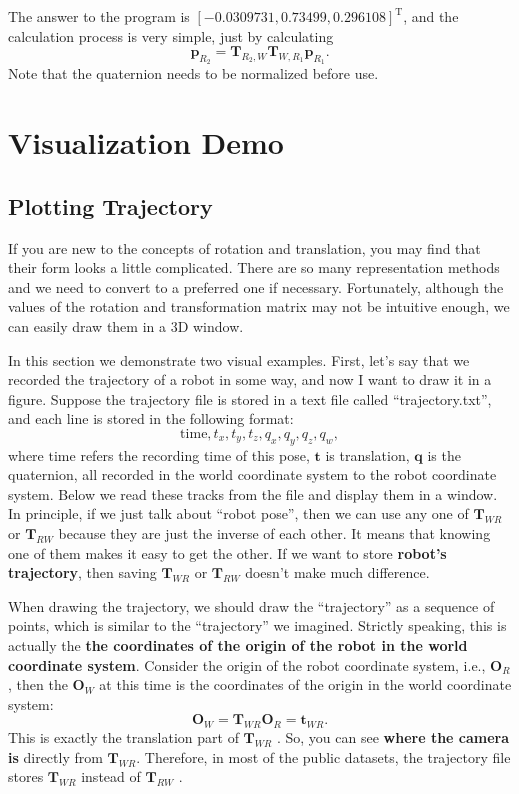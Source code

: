 The answer to the program is $ [- 0.0309731 , 0.73499 , 0.296108 ]^ \mathrm{T}$, and the calculation process is very simple, just by calculating $$ \mathbf{p}_{R_2} = \mathbf{T}_{ R_2, W} \mathbf{T}_{W, R_1} \mathbf{p}_{R_1}. $$ Note that the quaternion needs to be normalized before use.

\section{Visualization Demo}
\subsection{Plotting Trajectory}

If you are new to the concepts of rotation and translation, you may find that their form looks a little complicated. There are so many representation methods and we need to convert to a preferred one if necessary. Fortunately, although the values of the rotation and transformation matrix may not be intuitive enough, we can easily draw them in a 3D window.

In this section we demonstrate two visual examples. First, let's say that we recorded the trajectory of a robot in some way, and now I want to draw it in a figure. Suppose the trajectory file is stored in a text file called ``trajectory.txt'', and each line is stored in the following format: $$ \mathrm {time}, t_x, t_y, t_z, q_x, q_y, q_z, q_w, $$ where $ \mathrm {time} $ refers the recording time of this pose, $ \mathbf {t} $ is translation, $ \mathbf {q} $ is the quaternion, all recorded in the world coordinate system to the robot coordinate system. Below we read these tracks from the file and display them in a window. In principle, if we just talk about ``robot pose'', then we can use any one of $ \mathbf {T}_{WR} $ or $ \mathbf {T}_{RW} $ because they are just the inverse of each other. It means that knowing one of them makes it easy to get the other. If we want to store \textbf {robot's trajectory}, then saving $ \mathbf {T}_{WR} $ or $ \mathbf {T}_{RW} $ doesn't make much difference.

When drawing the trajectory, we should draw the ``trajectory'' as a sequence of points, which is similar to the ``trajectory'' we imagined. Strictly speaking, this is actually the \textbf {the coordinates of the origin of the robot in the world coordinate system}. Consider the origin of the robot coordinate system, i.e., $ \mathbf {O}_{R}$ , then the $ \mathbf{O}_{W}$ at this time is the coordinates of the origin in the world coordinate system:
\begin{equation}
\mathbf{O} _ {W} = \mathbf{T} _ {WR} \mathbf {O} _R = \mathbf {t} _ {WR}.
\end{equation}
This is exactly the translation part of $ \mathbf {T}_{WR} $ . So, you can see \textbf {where the camera is} directly from $ \mathbf {T}_{WR} $. Therefore, in most of the public datasets, the trajectory file stores $ \mathbf {T}_{WR} $ instead of $ \mathbf {T}_{RW} $ .

